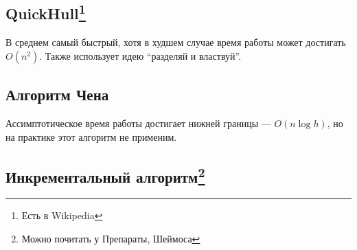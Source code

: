 \subsection[title]{QuickHull\footnote{Есть в Wikipedia}}
В среднем самый быстрый, хотя в худшем случае время работы может достигать $O(n^2)$. 
Также использует идею ``разделяй и властвуй''.

\subsection[title]{Алгоритм Чена}
Ассимптотическое время работы достигает нижней границы --- $O(n \log h)$, но на практике этот алгоритм не применим.

\subsection[title]{Инкрементальный алгоритм\footnote{Можно почитать у Препараты, Шеймоса}}